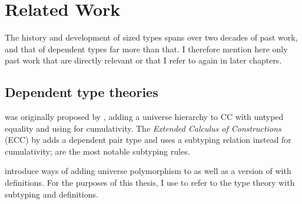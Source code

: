 \section{Related Work}

The history and development of sized types spans over two decades of past work,
and that of dependent types far more than that.
I therefore mention here only past work that are directly relevant
or that I refer to again in later chapters.

\subsection{Dependent type theories}

\GCC{}
was originally proposed by \citet{GCC-Coquand},
adding a universe hierarchy to CC with untyped equality
and using  for cumulativity.
The \emph{Extended Calculus of Constructions}
(ECC) by \citet{ECC} adds a dependent pair type
and uses a subtyping relation instead for cumulativity;
 are the most notable subtyping rules.
%
%
\citet{universes} introduce ways of adding universe polymorphism to \GCC
as well as a version of \GCC with definitions.
For the purposes of this thesis, I use \GCC to refer to the type theory
with subtyping and definitions.

